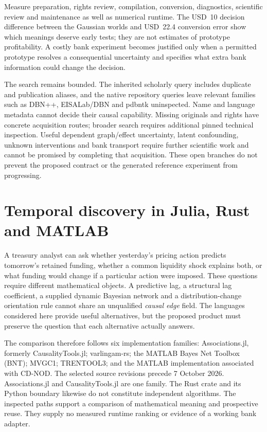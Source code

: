 Measure preparation, rights review, compilation, conversion, diagnostics,
scientific review and maintenance as well as numerical runtime. The USD~10
decision difference between the Gaussian worlds and USD~22.4 conversion error
show which meanings deserve early tests; they are not estimates of prototype
profitability. A costly bank experiment becomes justified only when a permitted
prototype resolves a consequential uncertainty and specifies what extra bank
information could change the decision. \citep{exec16_ct_oracle,exec16_ct_design}

The search remains bounded. The inherited scholarly query includes duplicate
and publication aliases, and the native repository queries leave relevant
families such as DBN++, EISALab/DBN and pdbntk uninspected. Name and language
metadata cannot decide their causal capability. Missing originals and rights
have concrete acquisition routes; broader search requires additional pinned
technical inspection. Useful dependent graph/effect uncertainty, latent
confounding, unknown interventions and bank transport require further
scientific work and cannot be promised by completing that acquisition.
These open branches do not prevent the proposed contract or the generated
reference experiment from progressing. \citep{exec16_ct_design}
\label{exec16:cxx-temporal-end}


\section{Temporal discovery in Julia, Rust and MATLAB}
\label{exec17:other-temporal}

A treasury analyst can ask whether yesterday's pricing action predicts
tomorrow's retained funding, whether a common liquidity shock explains both,
or what funding would change if a particular action were imposed. These
questions require different mathematical objects. A predictive lag, a
structural lag coefficient, a supplied dynamic Bayesian network and a
distribution-change orientation rule cannot share an unqualified
\emph{causal edge} field. The languages considered here provide useful
alternatives, but the proposed product must preserve the question that each
alternative actually answers.

The comparison therefore follows six implementation families:
Associations.jl, formerly CausalityTools.jl; varlingam-rs; the MATLAB Bayes
Net Toolbox (BNT); MVGC1; TRENTOOL3; and the MATLAB implementation associated
with CD-NOD. The selected source revisions precede 7 October 2026.
Associations.jl and CausalityTools.jl are one family. The Rust crate and its
Python boundary likewise do not constitute independent algorithms.
The inspected paths support a comparison of mathematical meaning and
prospective reuse. They supply no measured runtime ranking or evidence of a
working bank adapter.
\citep{exec17_temporal_associations,exec17_temporal_varlingam,
exec17_temporal_bnt,exec17_temporal_mvgc,exec17_temporal_trentool,
exec17_temporal_cdnod}

